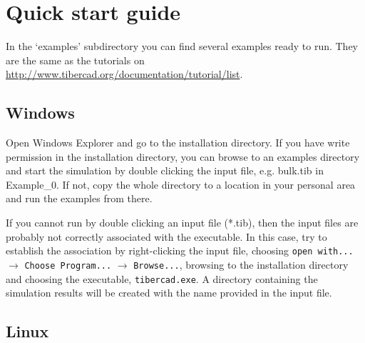 



  

\section*{Quick start guide}

In the `examples' subdirectory you can find several examples ready to run.
They are the same as
the tutorials on \url{http://www.tibercad.org/documentation/tutorial/list}.

\subsection*{Windows}

Open Windows Explorer and go to the \TiberCAD{} installation directory. 
If you have write permission in the installation directory, you can browse to
an examples directory and start the simulation by double clicking the input file, e.g. bulk.tib in Example\_0.
If not, copy the whole directory to a location in your personal area and run the
examples from there.

  If you cannot run \TiberCAD{} by double clicking an input file (*.tib), then the
input files are probably not correctly associated with the \TiberCAD{} executable.
In this case, try to establish the association by right-clicking the input file,
choosing \verb+open with...+ $\rightarrow$ \verb+Choose Program...+ $\rightarrow$ \verb+Browse...+, browsing to the \TiberCAD{} installation directory and choosing the \TiberCAD{} executable, \verb+tibercad.exe+.
A directory containing the simulation results will be created with the name provided in the input file.


\subsection*{Linux}


